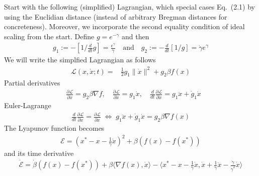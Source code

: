 \documentclass{article}
\renewcommand{\L}{{\mathcal L}}
\begin{document}
Start with the following (simplified) Lagrangian, which special cases Eq.~(2.1) by using the Euclidian distance (instead of arbitrary Bregman distances for concreteness). Moreover, we incorporate the second equality condition of ideal scaling from the start. Define $g=e^{-\gamma}$ and then
\begin{align}
g_1 := -\left[ 1/ \frac d{dt} g \right] =  \frac{e^\gamma}{\dot\gamma} \quad \text{and} \quad g_2 := -\frac d{dt} [1/g] = \dot \gamma e^\gamma
\end{align}
We will write the simplfied Lagrangian as follows
\begin{align}
\mathcal L(x,\dot x; t) = &
\frac{1}{2} {g_1} \| \dot x\|^2  + g_2   \beta f(x)
\end{align}
Partial derivatives 
\begin{align}
& \frac{\partial \mathcal L}{\partial x} =  g_2 \beta \nabla f, \quad 
\frac{\partial \mathcal L}{\partial \dot x} = g_1 \dot x, \quad
 \frac d {dt} \frac{\partial \L}{\partial \dot x} = g_1 \ddot x + \dot g_1 \dot x
\end{align}
Euler-Lagrange
\begin{align}
\frac d {dt} \frac{\partial \L}{\partial \dot x} = \frac{\partial \L}{\partial x}  \; \iff \; 
g_1 \ddot x + \dot g_1 \dot x = g_2 \beta \nabla f(x)
\end{align}
The Lyapunov function becomes 
\begin{align}
\mathcal E = \left(x^* - x - \frac{1}{\dot \gamma} \dot x\right)^2 + \beta (f(x)- f(x^*))
\end{align}
and its time derivative
\begin{align}
\dot {\mathcal E} = \dot \beta (f(x)-f(x^*)) + \beta \langle \nabla f(x), \dot x \rangle
- \langle x^* - x - \frac{1}{\dot \gamma} \dot x, \dot x + \frac 1 {\dot \gamma} \ddot x - \frac{\ddot \gamma}{\dot \gamma^2} \dot x\rangle
\end{align}
\end{document}
